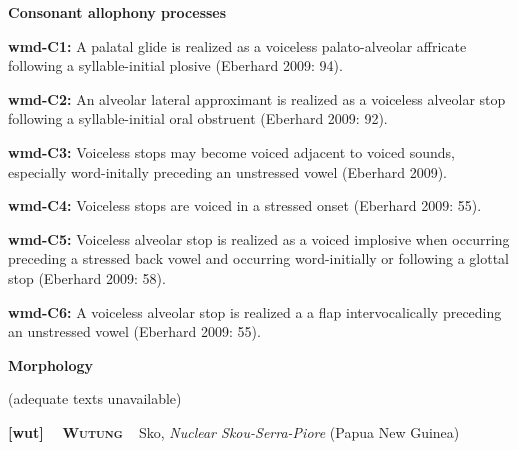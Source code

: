 \begin{styleBody}
\textbf{Consonant allophony processes}
\end{styleBody}

\begin{styleBody}
\textbf{wmd-C1: }A palatal glide is realized as a voiceless palato-alveolar affricate following a syllable-initial plosive (Eberhard 2009: 94).
\end{styleBody}

\begin{styleBody}
\textbf{wmd-C2: }An alveolar lateral approximant is realized as a voiceless alveolar stop following a syllable-initial oral obstruent (Eberhard 2009: 92).
\end{styleBody}

\begin{styleBody}
\textbf{wmd-C3: }Voiceless stops may become voiced adjacent to voiced sounds, especially word-initally preceding an unstressed vowel (Eberhard 2009).
\end{styleBody}

\begin{styleBody}
\textbf{wmd-C4: }Voiceless stops are voiced in a stressed onset (Eberhard 2009: 55).
\end{styleBody}

\begin{styleBody}
\textbf{wmd-C5: }Voiceless alveolar stop is realized as a voiced implosive when occurring preceding a stressed back vowel and occurring word-initially or following a glottal stop (Eberhard 2009: 58).
\end{styleBody}

\begin{styleBody}
\textbf{wmd-C6: }A voiceless alveolar stop is realized a a flap intervocalically preceding an unstressed vowel (Eberhard 2009: 55).
\end{styleBody}

\begin{styleBody}
\textbf{Morphology}
\end{styleBody}

\begin{styleBody}
(adequate texts unavailable)
\end{styleBody}

\clearpage\begin{styleBody}
\textbf{[wut] }\ \ \textbf{\textsc{Wutung}}\textbf{\ \ }Sko, \textit{Nuclear Skou-Serra-Piore} (Papua New Guinea)
\end{styleBody}

